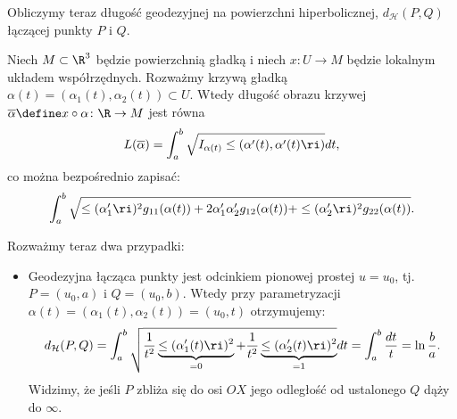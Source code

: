 \begin{frame}

Obliczymy teraz długość geodezyjnej na powierzchni hiperbolicznej, $d_{\mathcal{H}}(P,Q)$ łączącej punkty $P$ i $Q$. 


\begin{lemat}
Niech $M\subset \R^3$ będzie powierzchnią gładką i niech $x\colon U\to M$ będzie lokalnym układem współrzędnych.
Rozważmy krzywą gładką $\alpha(t)=(\alpha_1(t),\alpha_2(t))\subset U$.
Wtedy długość obrazu krzywej $\overline{\alpha}\define x\circ\alpha\colon \R\to M$ jest równa
\[L(\overline{\alpha})=\int_a^b\sqrt{I_{\alpha(t)}\le(\alpha'(t),\alpha'(t)\ri)}dt,\]
\pause co można bezpośrednio zapisać:
\[\int_a^b\sqrt{\le(\alpha_1'\ri)^2 g_{11}(\alpha(t))+ 2 \alpha_1'\alpha_2'g_{12}(\alpha(t))+\le(\alpha_2'\ri)^2 g_{22}(\alpha(t))}.\]
\end{lemat}

\end{frame}
\begin{frame}

Rozważmy teraz dwa przypadki:
\begin{itemize}
\item Geodezyjna łącząca punkty jest odcinkiem pionowej prostej $u=u_0$, tj. $P=(u_0,a)$ i $Q=(u_0,b)$. \pause Wtedy przy parametryzacji $\alpha(t)=(\alpha_1(t),\alpha_2(t))=(u_0,t)$ otrzymujemy:
\[d_{\mathcal{H}}(P,Q)=\int_a^b\sqrt{\frac{1}{t^{2}}\underbrace{\le(\alpha_1'(t)\ri)^2}_{=0}+\frac{1}{t^2}\underbrace{\le(\alpha_2'(t)\ri)^2}_{=1}}dt=
\int_a^b\frac{dt}{t}=\ln{\frac{b}{a}}.\]
\pause Widzimy, że jeśli $P$ zbliża się do osi $OX$ jego odległość od ustalonego $Q$ dąży do $\infty$.

\end{itemize}
\end{frame}
